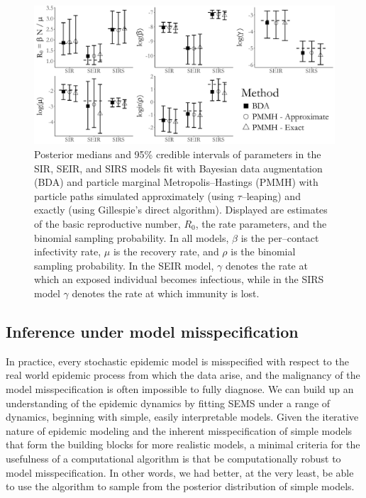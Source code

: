 \begin{figure}[!h]
	\centering
	\includegraphics[width=\linewidth]{figures/sim1_credints.pdf}
	\caption[Posterior estimates of SIR, SEIR, and SIRS model parameters fit to simualted data using Bayesian data augmentation and PMMH.]{Posterior medians and 95\% credible intervals of parameters in the SIR, SEIR, and SIRS models fit with Bayesian data augmentation (BDA) and particle marginal Metropolis--Hastings (PMMH) with particle paths simulated approximately (using $ \tau $--leaping) and exactly (using Gillespie's direct algorithm). Displayed are estimates of the basic reproductive number, $ R_0 $, the rate parameters, and the binomial sampling probability. In all models, $ \beta $ is the per--contact infectivity rate, $ \mu $ is the recovery rate, and $ \rho $ is the binomial sampling probability. In the SEIR model, $ \gamma $ denotes the rate at which an exposed individual becomes infectious, while in the SIRS model $ \gamma $ denotes the rate at which immunity is lost.}
	\label{fig:sim1_credint}
\end{figure}

\subsection{Inference under model misspecification}
\label{subsec:bda_misspec_sim}
In practice, every stochastic epidemic model is misspecified with respect to the real world epidemic process from which the data arise, and the malignancy of the model misspecification is often impossible to fully diagnose. We can build up an understanding of the epidemic dynamics by fitting SEMS under a range of dynamics, beginning with simple, easily interpretable models. Given the iterative nature of epidemic modeling and the inherent misspecification of simple models that form the building blocks for more realistic models, a minimal criteria for the usefulness of a computational algorithm is that be computationally robust to model misspecification. In other words, we had better, at the very least, be able to use the algorithm to sample from the posterior distribution of simple models. 

